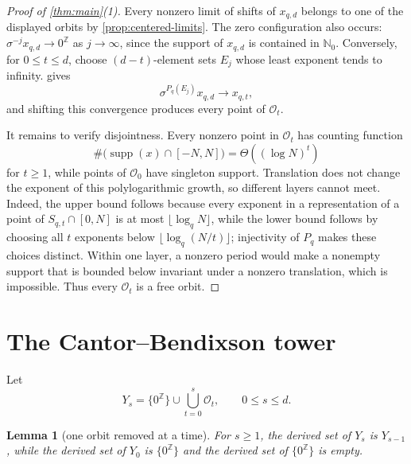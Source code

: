 \documentclass[11pt,a4paper]{amsart}
\newtheorem{lemma}[theorem]{Lemma}
\theoremstyle{definition}
\theoremstyle{remark}
\newcommand{\N}{\mathbb N}
\newcommand{\Z}{\mathbb Z}
\newcommand{\cO}{\mathcal O}
\newcommand{\supp}{\operatorname{supp}}
\newcommand{\zero}{0^{\Z}}
\newcommand{\pq}{P_q}
\begin{document}
\begin{proof}[Proof of \cref{thm:main}(1)]
Every nonzero limit of shifts of $x_{q,d}$ belongs to one of the displayed
orbits by \cref{prop:centered-limits}.  The zero configuration also occurs:
$\sigma^{-j}x_{q,d}\to\zero$ as $j\to\infty$, since the support of
$x_{q,d}$ is contained in $\N_0$.  Conversely, for $0\leq t\leq d$, choose
$(d-t)$-element sets $E_j$ whose least exponent tends to infinity.
 gives
\[
 \sigma^{\pq(E_j)}x_{q,d}\longrightarrow x_{q,t},
\]
and shifting this convergence produces every point of $\cO_t$.

It remains to verify disjointness.  Every nonzero point in $\cO_t$ has
counting function
\[
 \#\bigl(\supp(x)\cap[-N,N]\bigr)=\Theta((\log N)^t)
\]
for $t\geq1$, while points of $\cO_0$ have singleton support.  Translation
does not change the exponent of this polylogarithmic growth, so different
layers cannot meet.  Indeed, the upper bound follows because every exponent
in a representation of a point of $S_{q,t}\cap[0,N]$ is at most
$\lfloor\log_q N\rfloor$, while the lower bound follows by choosing all $t$
exponents below $\lfloor\log_q(N/t)\rfloor$; injectivity of $\pq$ makes these
choices distinct.  Within one layer, a nonzero period would make a
nonempty support that is bounded below invariant under a nonzero
translation, which is impossible.  Thus every $\cO_t$ is a free orbit.
\end{proof}

\section{The Cantor--Bendixson tower}

Let
\[
 Y_s=\{\zero\}\cup\bigcup_{t=0}^{s}\cO_t,
 \qquad 0\leq s\leq d.
\]

\begin{lemma}[one orbit removed at a time]\label{lem:one-orbit}
For $s\geq1$, the derived set of $Y_s$ is $Y_{s-1}$, while the derived set
of $Y_0$ is $\{\zero\}$ and the derived set of $\{\zero\}$ is empty.
\end{lemma}
\end{document}
